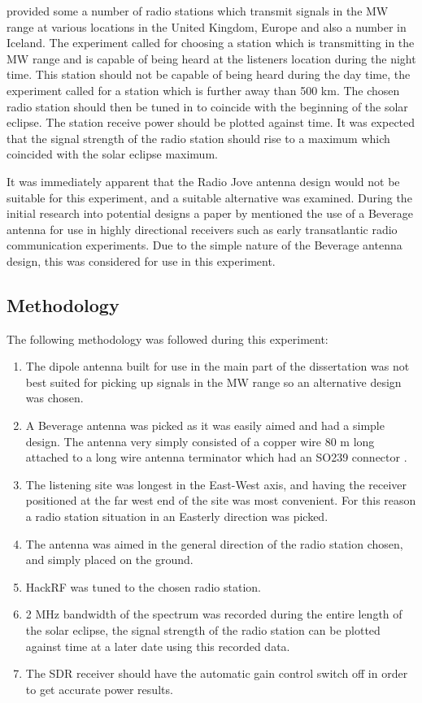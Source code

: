 \cite{RSGB-15-b} provided some a number of radio stations which transmit signals in the \gls{MW} range at various locations in the United Kingdom, Europe and also a number in Iceland. The experiment called for choosing a station which is transmitting in the \gls{MW} range and is capable of being heard at the listeners location during the night time. This station should not be capable of being heard during the day time, the experiment called for a station which is further away than 500 km. The chosen radio station should then be tuned in to coincide with the beginning of the solar eclipse. The station receive power should be plotted against time. It was expected that the signal strength of the radio station should rise to a maximum which coincided with the solar eclipse maximum.

It was immediately apparent that the Radio Jove antenna design would not be suitable for this experiment, and a suitable alternative was examined. During the initial research into potential designs a paper by \cite{litva-76} mentioned the use of a Beverage antenna for use in highly directional receivers such as early transatlantic radio communication experiments. Due to the simple nature of the Beverage antenna design, this was considered for use in this experiment.

\newpage
\subsection*{Methodology}
The following methodology was followed during this experiment:

\begin{enumerate}
	\item The dipole antenna built for use in the main part of the dissertation was not best suited for picking up signals in the \gls{MW} range so an alternative design was chosen. 
	\item A Beverage antenna was picked as it was easily aimed and had a simple design. The antenna very simply consisted of a copper wire 80 m long attached to a long wire antenna terminator which had an SO239 connector \citep{litva-76}.
	\item The listening site was longest in the East-West axis, and having the receiver positioned at the far west end of the site was most convenient. For this reason a radio station situation in an Easterly direction was picked.
	\item The antenna was aimed in the general direction of the radio station chosen, and simply placed on the ground.
	\item HackRF was tuned to the chosen radio station.
	\item 2 MHz bandwidth of the spectrum was recorded during the entire length of the solar eclipse, the signal strength of the radio station can be plotted against time at a later date using this recorded data.
	\item The \gls{SDR} receiver should have the automatic gain control switch off in order to get accurate power results. 
\end{enumerate}



